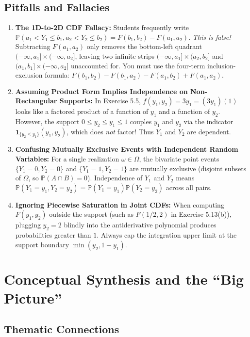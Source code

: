 \documentclass[11pt, letterpaper]{article}
\theoremstyle{definition}
\theoremstyle{remark}
\begin{document}
\subsection{Pitfalls and Fallacies}

\begin{enumerate}[label=\textbf{\arabic*.}]
    \item \textbf{The 1D-to-2D CDF Fallacy:} Students frequently write $\mathbb{P}(a_1 < Y_1 \le b_1, a_2 < Y_2 \le b_2) = F(b_1, b_2) - F(a_1, a_2)$. \emph{This is false!} Subtracting $F(a_1, a_2)$ only removes the bottom-left quadrant $(-\infty, a_1] \times (-\infty, a_2]$, leaving two infinite strips $(-\infty, a_1] \times (a_2, b_2]$ and $(a_1, b_1] \times (-\infty, a_2]$ unaccounted for. You must use the four-term inclusion-exclusion formula: $F(b_1, b_2) - F(b_1, a_2) - F(a_1, b_2) + F(a_1, a_2)$.
    \item \textbf{Assuming Product Form Implies Independence on Non-Rectangular Supports:} In Exercise 5.5, $f(y_1, y_2) = 3y_1 = (3y_1)(1)$ looks like a factored product of a function of $y_1$ and a function of $y_2$. However, the support $0 \le y_2 \le y_1 \le 1$ couples $y_1$ and $y_2$ via the indicator $\mathbf{1}_{\{y_2 \le y_1\}}(y_1, y_2)$, which does \emph{not} factor! Thus $Y_1$ and $Y_2$ are dependent.
    \item \textbf{Confusing Mutually Exclusive Events with Independent Random Variables:} For a single realization $\omega \in \Omega$, the bivariate point events $\{Y_1 = 0, Y_2 = 0\}$ and $\{Y_1 = 1, Y_2 = 1\}$ are mutually exclusive (disjoint subsets of $\Omega$, so $\mathbb{P}(A \cap B) = 0$). Independence of $Y_1$ and $Y_2$ means $\mathbb{P}(Y_1 = y_1, Y_2 = y_2) = \mathbb{P}(Y_1 = y_1)\mathbb{P}(Y_2 = y_2)$ across all pairs.
    \item \textbf{Ignoring Piecewise Saturation in Joint CDFs:} When computing $F(y_1, y_2)$ outside the support (such as $F(1/2, 2)$ in Exercise 5.13(b)), plugging $y_2 = 2$ blindly into the antiderivative polynomial produces probabilities greater than $1$. Always cap the integration upper limit at the support boundary $\min(y_2, 1 - y_1)$.
\end{enumerate}

\newpage

\section{Conceptual Synthesis and the ``Big Picture''}

\subsection{Thematic Connections}
\end{document}
